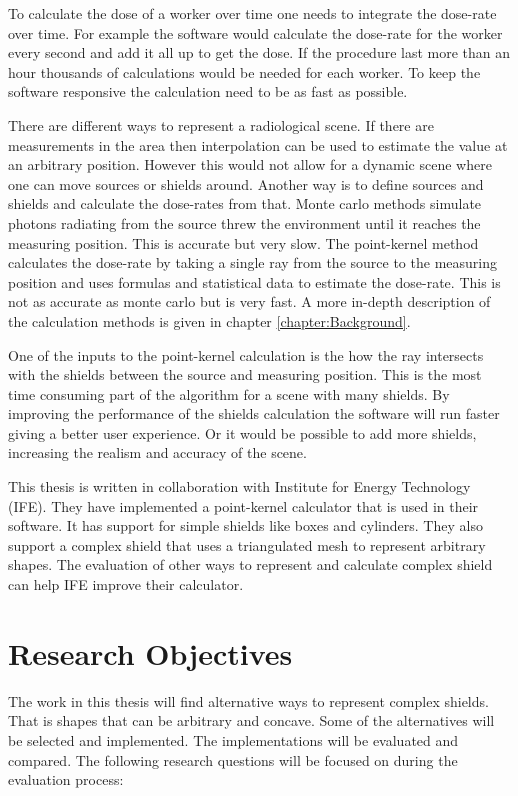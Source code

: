 \documentclass[11pt,twoside,a4paper]{report}
\begin{document}
To calculate the dose of a worker over time one needs to integrate the dose-rate over time. For example the software would calculate the dose-rate for the worker every second and add it all up to get the dose. If the procedure last more than an hour thousands of calculations would be needed for each worker. To keep the software responsive the calculation need to be as fast as possible.

There are different ways to represent a radiological scene. If there are measurements in the area then interpolation can be used to estimate the value at an arbitrary position. However this would not allow for a dynamic scene where one can move sources or shields around. Another way is to define sources and shields and calculate the dose-rates from that. Monte carlo methods simulate photons radiating from the source threw the environment until it reaches the measuring position. This is accurate but very slow. The point-kernel method calculates the dose-rate by taking a single ray from the source to the measuring position and uses formulas and statistical data to estimate the dose-rate. This is not as accurate as monte carlo but is very fast. A more in-depth description of the calculation methods is given in chapter \ref{chapter:Background}.

One of the inputs to the point-kernel calculation is the how the ray intersects with the shields between the source and measuring position. This is the most time consuming part of the algorithm for a scene with many shields. By improving the performance of the shields calculation the software will run faster giving a better user experience. Or it would be possible to add more shields, increasing the realism and accuracy of the scene.

This thesis is written in collaboration with Institute for Energy Technology (IFE). They have implemented a point-kernel calculator that is used in their software. It has support for simple shields like boxes and cylinders. They also support a complex shield that uses a triangulated mesh to represent arbitrary shapes. The evaluation of other ways to represent and calculate complex shield can help IFE improve their calculator.

\section{Research Objectives}
The work in this thesis will find alternative ways to represent complex shields. That is shapes that can be arbitrary and concave. Some of the alternatives will be selected and implemented. The implementations will be evaluated and compared. The following research questions will be focused on during the evaluation process:
\end{document}
